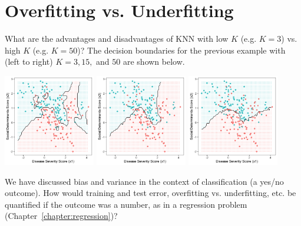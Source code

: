 \section{Overfitting vs. Underfitting}

\begin{question}{}
What are the advantages and disadvantages of KNN with low $K$ (e.g. $K=3$) vs. high $K$ (e.g. $K=50$)? The decision boundaries for the previous example with (left to right) $K=3, 15,$ and $50$ are shown below.
\begin{center}
\includegraphics[width=0.3\textwidth]{img/esl-knn-3.png}
\includegraphics[width=0.3\textwidth]{img/esl-knn-15.png}
\includegraphics[width=0.3\textwidth]{img/esl-knn-50.png}
\end{center}
\end{question}

\begin{question}{}
We have discussed bias and variance in the context of classification (a yes/no outcome). How would training and test error, overfitting vs. underfitting, etc. be quantified if the outcome was a number, as in a regression problem (Chapter~\ref{chapter:regression})?
\end{question}

